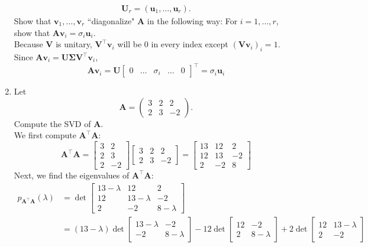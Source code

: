 \documentclass{article}
\begin{document}
\begin{enumerate}[label=(\alph*)]
\begin{gather*}
\textbf{U}_r = (\textbf{u}_1, \hdots, \textbf{u}_r).
\end{gather*}  
Show that $\textbf{v}_1, \hdots, \textbf{v}_r$ ``diagonalize" $\textbf{A}$ in the following way: For $i = 1,\hdots, r$, show that $\textbf{A}\textbf{v}_i = \sigma_i\textbf{u}_i$. \\
{\color{blue} Because $\mathbf{V}$ is unitary, $\mathbf{V^{\top}v}_i$ will be 0 in every index except $(\mathbf{Vv}_i)_i = 1$. Since $\mathbf{Av}_i = \mathbf{U\Sigma V^{\top}v}_i$, $$\mathbf{A}\mathbf{v}_i = \mathbf{U}\begin{bmatrix} 0 & \hdots & \sigma_i & \hdots & 0 \end{bmatrix}^{\top} = \sigma_i\mathbf{u}_i$$ }
\item Let 
\[
\textbf{A} = \begin{pmatrix}
3 & 2 & 2 \\
2 & 3 & -2
\end{pmatrix}.
\]
Compute the SVD of $\textbf{A}$. \\
{\color{blue} We first compute $\mathbf{A^{\top}A}$: $$\mathbf{A^{\top}A} = \begin{bmatrix} 3 & 2 \\ 2 & 3 \\ 2 & -2 \end{bmatrix}\begin{bmatrix} 3 & 2 & 2 \\ 2 & 3 & -2 \end{bmatrix} = \begin{bmatrix} 13 & 12 & 2 \\ 12 & 13 & -2 \\ 2 & -2 & 8 \end{bmatrix}$$ Next, we find the eigenvalues of $\mathbf{A^{\top}A}$: \begin{align*}
p_{\mathbf{A^{\top}A}}(\lambda) &= \det\begin{bmatrix} 13 - \lambda & 12 & 2 \\ 12 & 13 - \lambda & -2 \\ 2 & -2 & 8 - \lambda \end{bmatrix} \\
&= (13 - \lambda)\det\begin{bmatrix}13 - \lambda & -2 \\ -2 & 8 - \lambda \end{bmatrix} - 12\det\begin{bmatrix} 12 & -2 \\ 2 & 8 - \lambda\end{bmatrix} + 2\det\begin{bmatrix} 12 & 13 - \lambda \\ 2 & -2 \end{bmatrix} \\

\end{align*}}
\end{enumerate}
\end{document}
